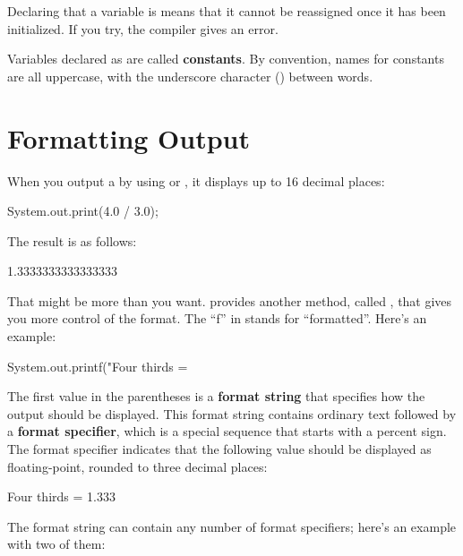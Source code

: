 
Declaring that a variable is  means that it cannot be reassigned once it has been initialized.
If you try, the compiler gives an error.

Variables declared as  are called {\bf constants}.
By convention, names for constants are all uppercase, with the underscore character (\java{_}) between words.


\section{Formatting Output}
\label{printf}

When you output a  by using  or , it displays up to 16 decimal places:

\begin{code}
System.out.print(4.0 / 3.0);
\end{code}

The result is as follows:

\begin{stdout}
1.3333333333333333
\end{stdout}


That might be more than you want.
 provides another method, called , that gives you more control of the format.
The ``f'' in  stands for ``formatted''.
Here's an example:

\begin{code}
System.out.printf("Four thirds = %
\end{code}


The first value in the parentheses is a {\bf format string} that specifies how the output should be displayed.
This format string contains ordinary text followed by a {\bf format specifier}, which is a special sequence that starts with a percent sign.
The format specifier  indicates that the following value should be displayed as floating-point, rounded to three decimal places:

\begin{stdout}
Four thirds = 1.333
\end{stdout}

The format string can contain any number of format specifiers; here's an example with two of them:

